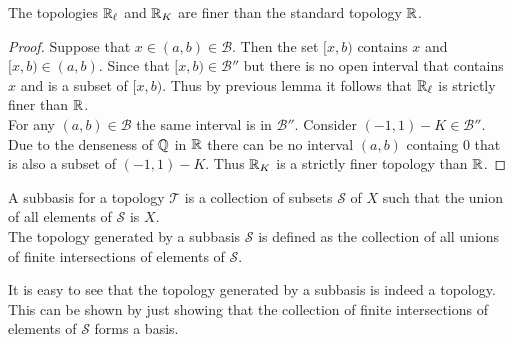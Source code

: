 \begin{lemma}
  The topologies $\mathbb{R}_\ell$ and $\mathbb{R}_K$ are finer than the standard topology $\mathbb{R}$.
\end{lemma}
\begin{proof}
  Suppose that $x\in (a,b) \in \mathscr{B}$. Then the set $[x,b)$ contains $x$ and $[x,b) \in (a,b)$. Since that $[x,b)\in \mathscr{B}''$ but there is no open interval that contains $x$ and is a subset of $[x,b)$. Thus by previous lemma it follows that $\mathbb{R}_\ell$ is strictly finer than $\mathbb{R}$.\\

  For any $(a,b)\in \mathscr{B}$ the same interval is in $ \mathscr{B}''$. Consider $(-1,1) - K \in \mathscr{B}''$. Due to the denseness of $\mathbb{Q}$ in $\mathbb{R}$ there can be no interval $(a,b)$ containg $0$ that is also a subset of $(-1,1)-K$. Thus $\mathbb{R}_K$ is a strictly finer topology than $\mathbb{R}$.
\end{proof}
\begin{definition}
  A subbasis for a topology $ \mathscr{T}$ is a collection of subsets $ \mathscr{S}$ of $X$ such that the union of all elements of $ \mathscr{S}$ is $X$.\\

  The topology generated by a subbasis $ \mathscr{S}$ is defined as the collection of all unions of finite intersections of elements of $ \mathscr{S}$.
\end{definition}
\begin{observation}
  It is easy to see that the topology generated by a subbasis is indeed a topology. This can be shown by just showing that the collection of finite intersections of elements of $ \mathscr{S}$ forms a basis.
\end{observation}

